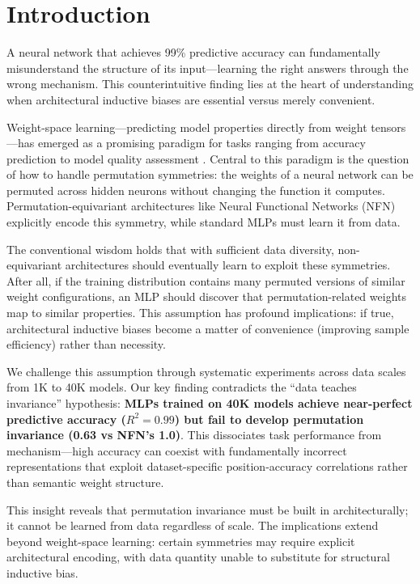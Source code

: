 \section{Introduction}

A neural network that achieves 99\% predictive accuracy can fundamentally misunderstand the structure of its input---learning the right answers through the wrong mechanism. This counterintuitive finding lies at the heart of understanding when architectural inductive biases are essential versus merely convenient.

Weight-space learning---predicting model properties directly from weight tensors---has emerged as a promising paradigm for tasks ranging from accuracy prediction to model quality assessment \cite{schurholt2022hyper}. Central to this paradigm is the question of how to handle permutation symmetries: the weights of a neural network can be permuted across hidden neurons without changing the function it computes. Permutation-equivariant architectures like Neural Functional Networks (NFN) \cite{zhou2023neural} explicitly encode this symmetry, while standard MLPs must learn it from data.

The conventional wisdom holds that with sufficient data diversity, non-equivariant architectures should eventually learn to exploit these symmetries. After all, if the training distribution contains many permuted versions of similar weight configurations, an MLP should discover that permutation-related weights map to similar properties. This assumption has profound implications: if true, architectural inductive biases become a matter of convenience (improving sample efficiency) rather than necessity.

We challenge this assumption through systematic experiments across data scales from 1K to 40K models. Our key finding contradicts the ``data teaches invariance'' hypothesis: \textbf{MLPs trained on 40K models achieve near-perfect predictive accuracy ($R^2=0.99$) but fail to develop permutation invariance (0.63 vs NFN's 1.0)}. This dissociates task performance from mechanism---high accuracy can coexist with fundamentally incorrect representations that exploit dataset-specific position-accuracy correlations rather than semantic weight structure.

This insight reveals that permutation invariance must be built in architecturally; it cannot be learned from data regardless of scale. The implications extend beyond weight-space learning: certain symmetries may require explicit architectural encoding, with data quantity unable to substitute for structural inductive bias.

